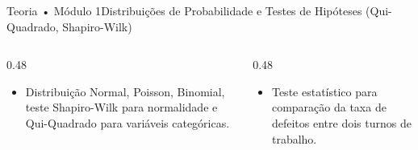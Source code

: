 \begin{senaiframe}{Teoria • Módulo 1}{Distribuições de Probabilidade e Testes de Hipóteses (Qui-Quadrado, Shapiro-Wilk)}
  \begin{columns}[t]
    \begin{column}{0.48\textwidth}
      \begin{tcolorbox}[senaibluecard, title={Fundamentos Teóricos}]
        \begin{itemize}
          \item Distribuição Normal, Poisson, Binomial, teste Shapiro-Wilk para normalidade e Qui-Quadrado para variáveis categóricas.
        \end{itemize}
      \end{tcolorbox}
    \end{column}
    \begin{column}{0.48\textwidth}
      \begin{tcolorbox}[senaigreencard, title={Prática \& Laboratório}]
        \begin{itemize}
          \item Teste estatístico para comparação da taxa de defeitos entre dois turnos de trabalho.
        \end{itemize}
      \end{tcolorbox}
    \end{column}
  \end{columns}
\end{senaiframe}
